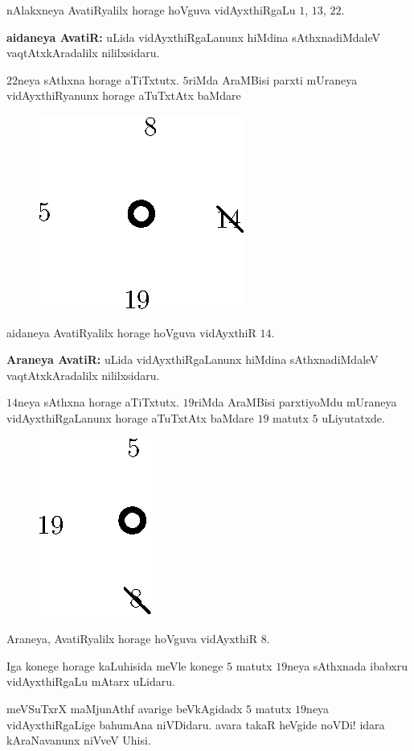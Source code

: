 nAlakxneya AvatiRyalilx horage hoVguva vidAyxthiRgaLu $1$, $13$, $22$.

{\bf aidaneya AvatiR:} uLida vidAyxthiRgaLanunx hiMdina sAthxnadiMdaleV vaqtAtxkAradalilx nililxsidaru.

$22$neya sAthxna horage aTiTxtutx. $5$riMda AraMBisi parxti mUraneya vidAyxthiRyanunx horage aTuTxtAtx baMdare
\begin{figure}[H]
\centering
\includegraphics[scale=0.8]{src/figures/fig13.eps}
\end{figure}

aidaneya AvatiRyalilx horage hoVguva vidAyxthiR $14$.

{\bf Araneya AvatiR:} uLida vidAyxthiRgaLanunx hiMdina sAthxnadiMdaleV vaqtAtxkAradalilx nililxsidaru.

$14$neya sAthxna horage aTiTxtutx. $19$riMda AraMBisi parxtiyoMdu mUraneya vidAyxthiRgaLanunx horage aTuTxtAtx baMdare $19$ matutx $5$ uLiyutatxde. 
\begin{figure}[H]
\centering
\includegraphics[scale=0.8]{src/figures/fig14.eps}
\end{figure}

Araneya, AvatiRyalilx horage hoVguva vidAyxthiR $8$.

Iga konege horage kaLuhisida meVle konege $5$ matutx $19$neya sAthxnada ibabxru vidAyxthiRgaLu mAtarx uLidaru.

meVSuTxrX maMjunAthf avarige beVkAgidadx $5$ matutx $19$neya vidAyxthiRgaLige bahumAna niVDidaru. avara takaR heVgide noVDi! idara kAraNavanunx niVveV Uhisi.
